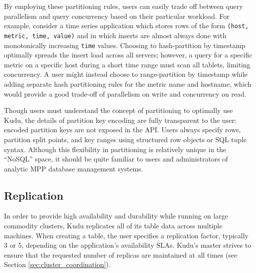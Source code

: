\documentclass[twocolumn,9pt]{article}
\begin{document}
By employing these partitioning rules, users can easily trade off between query parallelism and
query concurrency based on their particular workload. For example, consider a time series
application which stores rows of the form {\tt (host, metric, time, value)} and in which inserts
are almost always done with monotonically increasing {\tt time} values. Choosing to
hash-partition by timestamp optimally spreads the insert load across all servers; however, a query
for a specific metric on a specific host during a short time range must scan all tablets, limiting
concurrency. A user might instead choose to range-partition by timestamp while adding separate
hash partitioning rules for the metric name and hostname, which would provide a good trade-off
of parallelism on write and concurrency on read.

Though users must understand the concept of partitioning to optimally use Kudu, the details
of partition key encoding are fully transparent to the user: encoded partition keys are not exposed
in the API. Users always specify rows, partition split points, and key ranges using structured
row objects or SQL tuple syntax. Although this flexibility in partitioning is relatively unique
in the ``NoSQL'' space, it should be quite familiar to users and administrators of
analytic MPP database management systems.

\subsection{Replication}
\label{sec:replication}

In order to provide high availability and durability while running on large commodity clusters,
Kudu replicates all of its table data across multiple machines. When creating a table,
the user specifies a replication factor, typically 3 or 5, depending on the application's
availability SLAs. Kudu's master strives to ensure that the requested number of replicas are maintained
at all times (see Section \ref{sec:cluster_coordination}).
\end{document}
